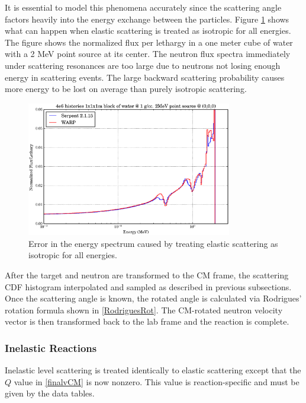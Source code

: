 It is essential to model this phenomena accurately since the scattering angle factors heavily into the energy exchange between the particles.  Figure \ref{scattering_error} shows what can happen when elastic scattering is treated as isotropic for all energies.  The figure shows the normalized flux per lethargy in a one meter cube of water with a 2 MeV point source at its center.  The neutron flux spectra immediately under scattering resonances are too large due to neutrons not losing enough energy in scattering events.  The large backward scattering probability causes more energy to be lost on average than purely isotropic scattering.

\begin{figure}[h!] 
  \centering
    \includegraphics[width=0.8\textwidth]{graphics/scattering_error.eps}
     \caption{Error in the energy spectrum caused by treating elastic scattering as isotropic for all energies.\label{scattering_error}}
\end{figure}

After the target and neutron are transformed to the CM frame, the scattering CDF histogram interpolated and sampled as described in previous subsections.  Once the scattering angle is known, the rotated angle is calculated via Rodrigues' rotation formula shown in \eqref{RodriguesRot}.  The CM-rotated neutron velocity vector is then transformed back to the lab frame and the reaction is complete.

\subsubsection{Inelastic Reactions}

Inelastic level scattering is treated identically to elastic scattering except that the $Q$ value in \eqref{finalvCM} is now nonzero.  This value is reaction-specific and must be given by the data tables.  

